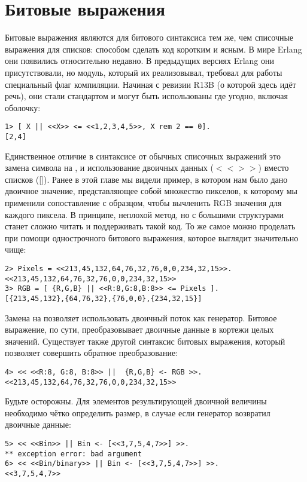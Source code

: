 \section{Битовые выражения}
Битовые выражения являются для битового синтаксиса тем же, чем списочные выражения для списков: способом сделать код коротким и ясным. В мире Erlang они появились относительно недавно. В предыдущих версиях Erlang они присутствовали, но модуль, который их реализовывал, требовал для работы специальный флаг компиляции. Начиная с ревизии R13B (о которой здесь идёт речь), они стали стандартом и могут быть использованы где угодно, включая оболочку:
\begin{lstlisting}[style=repl]
1> [ X || <<X>> <= <<1,2,3,4,5>>, X rem 2 == 0].    
[2,4]
\end{lstlisting}

Единственное отличие в синтаксисе от обычных списочных выражений это замена символа \ops{$<-$} на \ops{$<=$}, и использование двоичных данных ($<< >>$) вместо списков ([]). Ранее в этой главе мы видели пример, в котором нам было дано двоичное значение, представляющее собой множество пикселов, к которому мы применили сопоставление с образцом, чтобы вычленить RGB значения для каждого пиксела. В принципе, неплохой метод, но с большими структурами станет сложно читать и поддерживать такой код. То же самое можно проделать при помощи однострочного битового выражения, которое выглядит значительно чище:
\begin{lstlisting}[style=repl]
2> Pixels = <<213,45,132,64,76,32,76,0,0,234,32,15>>.
<<213,45,132,64,76,32,76,0,0,234,32,15>>
3> RGB = [ {R,G,B} || <<R:8,G:8,B:8>> <= Pixels ].
[{213,45,132},{64,76,32},{76,0,0},{234,32,15}]
\end{lstlisting}

Замена \ops{$<-$} на \ops{$<=$} позволяет использовать двоичный поток как генератор. Битовое выражение, по сути, преобразовывает двоичные данные в кортежи целых значений. Существует также другой синтаксис битовых выражения, который позволяет совершить обратное преобразование:
\begin{lstlisting}[style=repl]
4> << <<R:8, G:8, B:8>> ||  {R,G,B} <- RGB >>.
<<213,45,132,64,76,32,76,0,0,234,32,15>>
\end{lstlisting}

Будьте осторожны. Для элементов результирующей двоичной величины необходимо чётко определить размер, в случае если генератор возвратил двоичные данные:
\begin{lstlisting}[style=repl]
5> << <<Bin>> || Bin <- [<<3,7,5,4,7>>] >>.
** exception error: bad argument
6> << <<Bin/binary>> || Bin <- [<<3,7,5,4,7>>] >>. 
<<3,7,5,4,7>>
\end{lstlisting}

